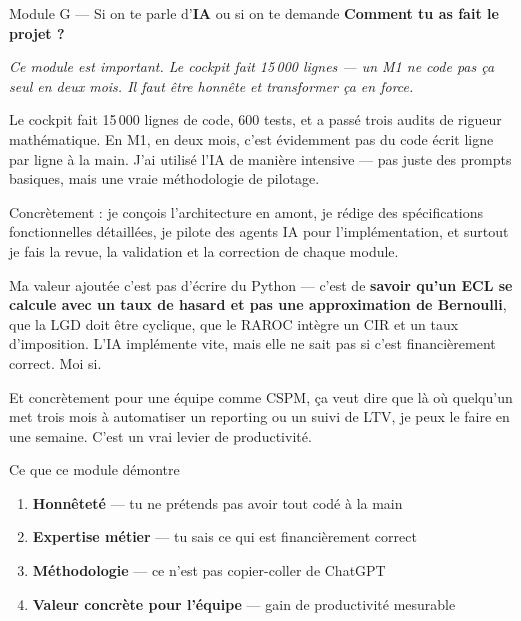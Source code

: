 \documentclass[11pt,a4paper]{article}
\begin{document}
\begin{modulebox}{Module G --- Si on te parle d'\textbf{IA} ou si on te demande \textbf{\og Comment tu as fait le projet ? \fg{}}}

\textit{Ce module est important. Le cockpit fait 15\,000 lignes --- un M1 ne code pas
\c{c}a seul en deux mois. Il faut \^etre honn\^ete et transformer \c{c}a en force.}

\begin{verbatimbox}
\og Le cockpit fait 15\,000 lignes de code, 600 tests, et a pass\'e trois
audits de rigueur math\'ematique. En M1, en deux mois, c'est \'evidemment
pas du code \'ecrit ligne par ligne \`a la main. J'ai utilis\'e l'IA de
mani\`ere intensive --- pas juste des prompts basiques, mais une vraie
m\'ethodologie de pilotage.

Concr\`etement : je con\c{c}ois l'architecture en amont, je r\'edige des
sp\'ecifications fonctionnelles d\'etaill\'ees, je pilote des agents IA
pour l'impl\'ementation, et surtout je fais la revue, la validation et la
correction de chaque module.

Ma valeur ajout\'ee c'est pas d'\'ecrire du Python --- c'est de
\textbf{savoir qu'un ECL se calcule avec un taux de hasard et pas une
approximation de Bernoulli}, que la LGD doit \^etre cyclique, que le RAROC
int\`egre un CIR et un taux d'imposition. L'IA impl\'emente vite, mais
elle ne sait pas si c'est financièrement correct. Moi si.

Et concr\`etement pour une \'equipe comme CSPM, \c{c}a veut dire que l\`a o\`u
quelqu'un met trois mois \`a automatiser un reporting ou un suivi de LTV,
je peux le faire en une semaine. C'est un vrai levier de productivit\'e. \fg{}
\end{verbatimbox}

\begin{goodbox}{Ce que ce module d\'emontre}
\begin{enumerate}[nosep, leftmargin=16pt]
\item \textbf{Honn\^etet\'e} --- tu ne pr\'etends pas avoir tout cod\'e \`a la main
\item \textbf{Expertise m\'etier} --- tu sais ce qui est financièrement correct
\item \textbf{M\'ethodologie} --- ce n'est pas \og copier-coller de ChatGPT \fg{}
\item \textbf{Valeur concr\`ete pour l'\'equipe} --- gain de productivit\'e mesurable
\end{enumerate}
\end{goodbox}


\end{modulebox}
\end{document}
